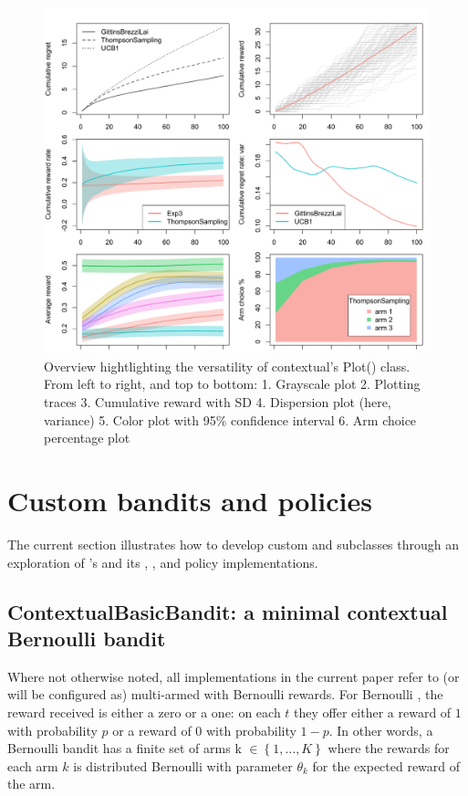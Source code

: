 \documentclass{jss}
\begin{document}
\begin{figure}[H]
\centering
\includegraphics[width=.99\textwidth]{fig/section_4_2_plot}
\caption{Overview hightlighting the versatility of contextual's Plot() class. From left to right, and top to bottom: 1. Grayscale plot 2. Plotting traces 3. Cumulative reward with SD 4. Dispersion plot (here, variance) 5. Color plot with 95\% confidence interval 6. Arm choice percentage plot }
\label{fig:section_4_2_plot}
\end{figure}

\section{Custom bandits and policies} \label{extending}

The current section illustrates how to develop custom  and  subclasses through an exploration of 's  and its , , and  policy implementations.

\subsection{ContextualBasicBandit: a minimal contextual Bernoulli bandit} \label{ContextualBasicBandit}

Where not otherwise noted, all  implementations in the current paper refer to (or will be configured as) multi-armed  with Bernoulli rewards. For Bernoulli , the reward received is either a zero or a one: on each $t$ they offer either a reward of $1$ with probability $p$ or a reward of $0$ with probability $1 - p$. In other words, a Bernoulli bandit has a finite set of arms k \(  \in \left\{ 1, \dots, K \right\} \) where the rewards for each arm $k$ is distributed Bernoulli with parameter $\theta_k$ for the expected reward of the arm.
\end{document}
